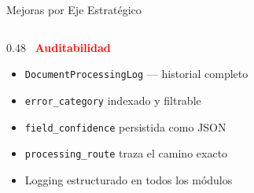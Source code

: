 \documentclass[aspectratio=169,10pt]{beamer}
\begin{document}
\begin{frame}{Mejoras por Eje Estrat\'egico}
\begin{columns}[T]
\begin{column}{0.48\textwidth}
\vspace{8pt}
\textcolor{red}{\ \textbf{Auditabilidad}}
\begin{itemize}\small
\item \texttt{DocumentProcessingLog} --- historial completo
\item \texttt{error\_category} indexado y filtrable
\item \texttt{field\_confidence} persistida como JSON
\item \texttt{processing\_route} traza el camino exacto
\item Logging estructurado en todos los m\'odulos
\end{itemize}

\end{column}
\end{columns}

\end{frame}
\end{document}
